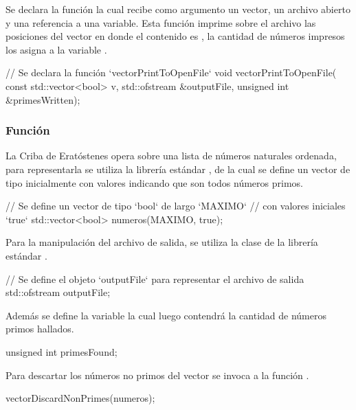 \documentclass[12pt]{article}
\newenvironment{fullgrayverb}
{\verbbox}
{\endverbbox\par\colorbox{gray!25}{\parbox{\textwidth}{\theverbbox}}\par}
\begin{document}
Se declara la función  la cual recibe como
argumento un vector, un archivo abierto y una referencia a una variable. Esta
función imprime sobre el archivo las posiciones del vector en donde el
contenido es , la cantidad de números impresos los asigna a la
variable .

\begin{fullgrayverb}[\mbox{}]
// Se declara la función `vectorPrintToOpenFile`
void vectorPrintToOpenFile(
         const std::vector<bool> v,
         std::ofstream &outputFile,
         unsigned int &primesWritten);
\end{fullgrayverb}

\subsubsection{Función }

La Criba de Eratóstenes opera sobre una lista de números naturales ordenada,
para representarla se utiliza la librería estándar , de la cual
se define un vector de tipo  inicialmente con valores 
indicando que son todos números primos.

\begin{fullgrayverb}[\mbox{}]
// Se define un vector de tipo `bool` de largo `MAXIMO`
// con valores iniciales `true`
std::vector<bool> numeros(MAXIMO, true);
\end{fullgrayverb}

\pagebreak
Para la manipulación del archivo de salida, se utiliza la clase 
de la librería estándar .

\begin{fullgrayverb}[\mbox{}]
// Se define el objeto `outputFile` para representar el archivo de salida
std::ofstream outputFile;
\end{fullgrayverb}

Además se define la variable  la cual luego contendrá la
cantidad de números primos hallados.

\begin{fullgrayverb}[\mbox{}]
unsigned int primesFound;
\end{fullgrayverb}

Para descartar los números no primos del vector  se invoca a la
función \linebreak{}.

\begin{fullgrayverb}[\mbox{}]
vectorDiscardNonPrimes(numeros);
\end{fullgrayverb}
\end{document}
